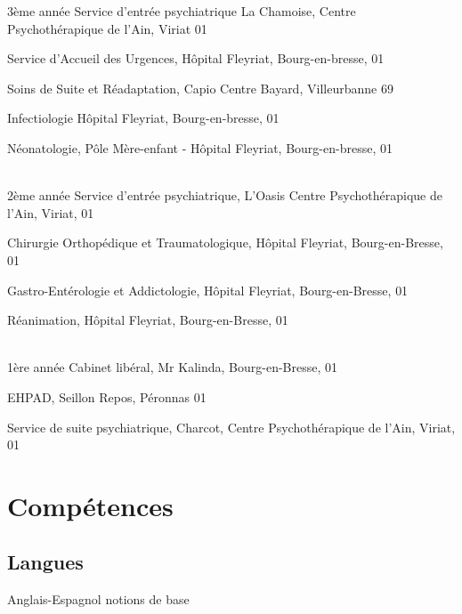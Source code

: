 \documentclass[10pt,a4paper]{moderncv}
\begin{document}
\cventry
	{3ème année}
	{Service d'entrée psychiatrique}
	{La Chamoise, Centre Psychothérapique de l’Ain,}
	{Viriat}
	{01}
	{}

\cventry
	{}
	{Service d’Accueil des Urgences,}
	{Hôpital Fleyriat,}
	{Bourg-en-bresse,}
	{01}
	{}

\cventry
	{}
	{Soins de Suite et Réadaptation,}
	{Capio Centre Bayard,}
	{Villeurbanne}
	{69}
	{}

\cventry
	{}
	{Infectiologie}
	{Hôpital Fleyriat,}
	{Bourg-en-bresse,}
	{01}
	{}

\cventry
	{}
	{Néonatologie,}
	{Pôle Mère-enfant - Hôpital Fleyriat,}
	{Bourg-en-bresse,}
	{01}
	{}

~~\\

\cventry
	{2ème année}
	{Service d’entrée psychiatrique, L'Oasis}
	{Centre Psychothérapique de l’Ain,}
	{Viriat,}
	{01}
	{}

\cventry
	{}
	{Chirurgie Orthopédique et Traumatologique,}
	{Hôpital Fleyriat,}
	{Bourg-en-Bresse,}
	{01}
	{}

\cventry
	{}
	{Gastro-Entérologie et Addictologie,}
    {Hôpital Fleyriat,}
	{Bourg-en-Bresse,}
	{01}
	{}

\cventry
	{}
	{Réanimation,}
	{Hôpital Fleyriat,}
	{Bourg-en-Bresse,}
	{01}
	{}

~~\\

\cventry
	{1ère année}
	{Cabinet libéral,}
	{Mr Kalinda,}
	{Bourg-en-Bresse,}
	{01}
	{}

\cventry
	{}
	{EHPAD,}
	{Seillon Repos,}
	{Péronnas}
	{01}
	{}

\cventry
	{}
	{Service de suite psychiatrique,}
	{Charcot, Centre Psychothérapique de l’Ain,}
	{Viriat,}
	{01}
	{}



\section{Compétences}

\subsection{Langues}


\cvlanguage
	{Anglais-Espagnol}
	{notions de base}
	{}
\end{document}

